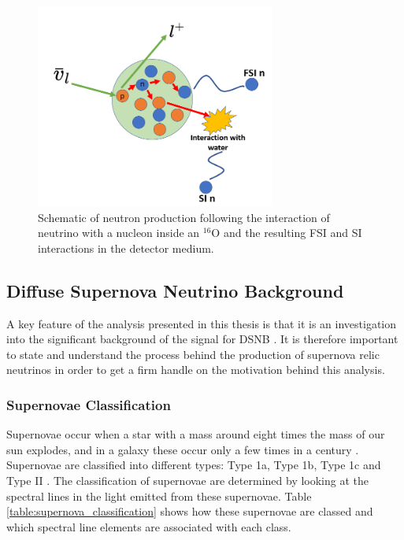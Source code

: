\begin{figure}
    \centering
    \includegraphics[width=0.7\textwidth]{Figures/fsi_schematic.png}
    \caption{Schematic of neutron production following the interaction of neutrino with a nucleon inside an ${ }^{16} \mathrm{O}$ and the resulting FSI and SI interactions in the detector medium.}
    \label{fig:FSI_SI}
\end{figure}



\subsection{Diffuse Supernova Neutrino Background}

A key feature of the analysis presented in this thesis is that it is an investigation into the significant background of the signal for DSNB \cite{malek2003search}. It is therefore important to state and understand the process behind the production of supernova relic neutrinos in order to get a firm handle on the motivation behind this analysis. 

\subsubsection{Supernovae Classification}
Supernovae occur when a star with a mass around eight times the mass of our sun explodes, and in a galaxy these occur only a few times in a century \cite{van1991supernova}. Supernovae are classified into different types: Type 1a, Type 1b, Type 1c and Type II \cite{turatto2003classification}. The classification of supernovae are determined by looking at the spectral lines in the light emitted from these supernovae. Table \ref{table:supernova_classification} shows how these supernovae are classed and which spectral line elements are associated with each class. 

